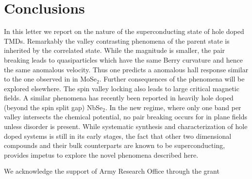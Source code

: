 \section{Conclusions}

In this letter we report on the nature of the superconducting state of hole doped TMDs. Remarkably the valley contrasting phenomena of the parent state is inherited by the correlated state. While the magnitude is smaller, the pair breaking leads to quasiparticles which have the same Berry curvature and hence the same anomalous velocity. Thus one predicts a anomalous hall response similar to the one observed in in MoSe$_{2}$. Further consequences of the phenomena will be explored elsewhere. The spin valley locking also leads to large critical magnetic fields. A similar phenomena has recently been reported in heavily hole doped (beyond the spin split gap) NbSe$_{2}$. In the new regime, where only one band per valley intersects the chemical potential, no pair breaking occurs for in plane fields unless disorder is present. While systematic synthesis and characterization of hole doped systems is still in its early stages, the fact that other two dimensional compounds and their bulk counterparts are known to be superconducting, provides impetus to explore the novel phenomena described here.

We acknowledge the support of Army Research Office through the grant 